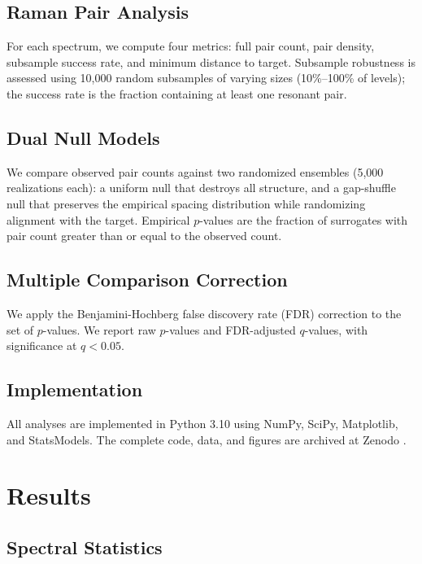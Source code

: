 \documentclass[11pt,a4paper]{article}
\begin{document}
\subsection{Raman Pair Analysis}
\label{sec:raman}

For each spectrum, we compute four metrics: full pair count, pair density, subsample success rate, and minimum distance to target. Subsample robustness is assessed using 10,000 random subsamples of varying sizes (10\%--100\% of levels); the success rate is the fraction containing at least one resonant pair.

\subsection{Dual Null Models}
\label{sec:nullmodels}

We compare observed pair counts against two randomized ensembles (5,000 realizations each): a uniform null that destroys all structure, and a gap-shuffle null that preserves the empirical spacing distribution while randomizing alignment with the target. Empirical $p$-values are the fraction of surrogates with pair count greater than or equal to the observed count.

\subsection{Multiple Comparison Correction}
\label{sec:fdr}

We apply the Benjamini-Hochberg false discovery rate (FDR) correction \cite{Benjamini1995} to the set of $p$-values. We report raw $p$-values and FDR-adjusted $q$-values, with significance at $q < 0.05$.

\subsection{Implementation}
\label{sec:implementation}

All analyses are implemented in Python 3.10 using NumPy, SciPy, Matplotlib, and StatsModels. The complete code, data, and figures are archived at Zenodo \cite{Zenodo2026}.

\FloatBarrier

\section{Results}
\label{sec:results}

\subsection{Spectral Statistics}
\label{sec:specstats}
\end{document}
